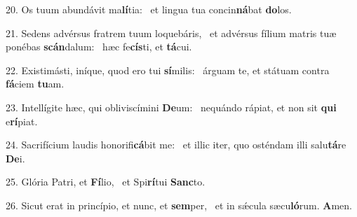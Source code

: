 20. Os tuum abundávit ma\textbf{lí}tia: \ast\  et lingua tua concin\textbf{ná}bat \textbf{do}los.\

21. Sedens advérsus fratrem tuum loquebáris, \dag\  et advérsus fílium matris tuæ ponébas \textbf{scán}dalum: \ast\  hæc fe\textbf{cís}ti, et \textbf{tá}cui.\

22. Existimásti, iníque, quod ero tui \textbf{sí}milis: \ast\  árguam te, et státuam contra \textbf{fá}ciem \textbf{tu}am.\

23. Intellígite hæc, qui obliviscímini \textbf{De}um: \ast\  nequándo rápiat, et non sit \textbf{qui} e\textbf{rí}piat.\

24. Sacrifícium laudis honorifi\textbf{cá}bit me: \ast\  et illic iter, quo osténdam illi salu\textbf{tá}re \textbf{De}i.\

25. Glória Patri, et \textbf{Fí}lio, \ast\  et Spi\textbf{rí}tui \textbf{Sanc}to.\

26. Sicut erat in princípio, et nunc, et \textbf{sem}per, \ast\  et in sǽcula sæcu\textbf{ló}rum. \textbf{A}men.\

